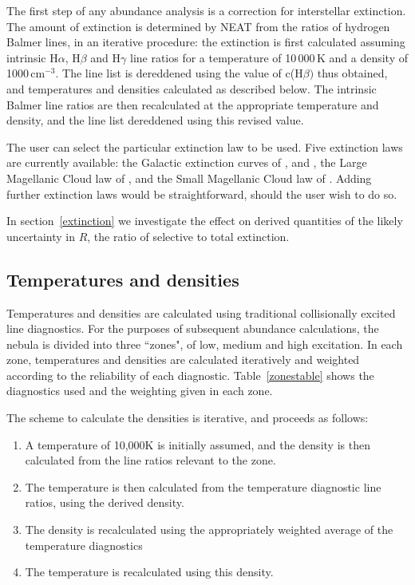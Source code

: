 \documentclass[useAMS,usenatbib]{mn2e}
\begin{document}
The first step of any abundance analysis is a correction for interstellar extinction.  The amount of extinction is determined by NEAT from the ratios of hydrogen Balmer lines, in an iterative procedure: the extinction is first calculated assuming intrinsic H$\alpha$, H$\beta$ and H$\gamma$ line ratios for a temperature of 10\,000\,K and a density of 1000\,cm$^{-3}$.  The line list is dereddened using the value of c(H$\beta)$ thus obtained, and temperatures and densities calculated as described below.  The intrinsic Balmer line ratios are then recalculated at the appropriate temperature and density, and the line list dereddened using this revised value.

The user can select the particular extinction law to be used.  Five extinction laws are currently available: the Galactic extinction curves of \citet{1983MNRAS.203..301H}, \citet{1990ApJS...72..163F} and \citet{1989ApJ...345..245C}, the Large Magellanic Cloud law of \citet{1983MNRAS.203..301H}, and the Small Magellanic Cloud law of \citet{1984A&A...132..389P}.  Adding further extinction laws would be straightforward, should the user wish to do so.

In section~\ref{extinction} we investigate the effect on derived quantities of the likely uncertainty in $R$, the ratio of selective to total extinction.

\subsection{Temperatures and densities}

Temperatures and densities are calculated using traditional collisionally excited line diagnostics.  For the purposes of subsequent abundance calculations, the nebula is divided into three ``zones", of low, medium and high excitation.  In each zone, temperatures and densities are calculated iteratively and weighted according to the reliability of each diagnostic.  Table~\ref{zonestable} shows the diagnostics used and the weighting given in each zone.

The scheme to calculate the densities is iterative, and proceeds as follows:

\begin{enumerate}
\item A temperature of 10,000K is initially assumed, and the density is then calculated from the line ratios relevant to the zone.
\item The temperature is then calculated from the temperature diagnostic line ratios, using the derived density.
\item The density is recalculated using the appropriately weighted average of the temperature diagnostics
\item The temperature is recalculated using this density.
\end{enumerate}
\end{document}
